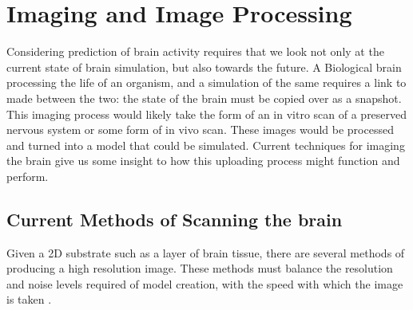\section{Imaging and Image Processing}

Considering prediction of brain activity requires that we look not only at the
current state of brain simulation, but also towards the future. A Biological
brain processing the life of an organism, and a simulation of the same requires
a link to made between the two: the state of the brain must be copied over as a
snapshot. This imaging process would likely take the form of an in vitro scan of
a preserved nervous system or some form of in vivo scan. These images would be
processed and turned into a model that could be simulated. Current techniques for imaging the brain give us some insight to how this
uploading process might function and perform.

\subsection{Current Methods of Scanning the brain}

Given a 2D substrate such as a layer of brain tissue, there are several methods
of producing a high resolution image. These methods must balance the resolution
and noise levels required of model creation, with the speed with which the image
is taken \autocite{bostrom_whole_2008,mikula_progress_2016}.

